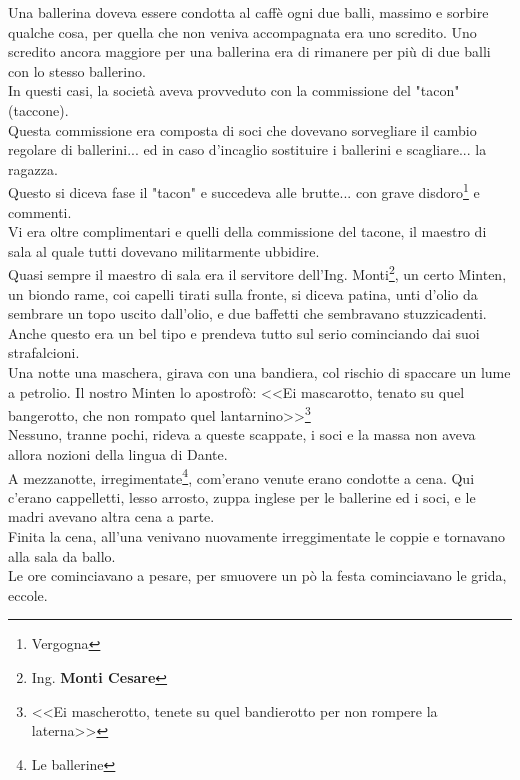 \indent Una ballerina doveva essere condotta al caffè ogni due balli, massimo e sorbire qualche cosa, per quella che non veniva accompagnata era uno scredito. Uno scredito ancora maggiore per una ballerina era di rimanere per più di due balli con lo stesso ballerino.\\
\indent In questi casi, la società aveva provveduto con la commissione del "tacon" (taccone).\\
\indent Questa commissione era composta di soci che dovevano sorvegliare il cambio regolare di ballerini... ed in caso d'incaglio sostituire i ballerini e scagliare... la ragazza.\\
\indent Questo si diceva fase il "tacon" e succedeva alle brutte... con grave disdoro\footnote{Vergogna} e commenti.\\
\indent Vi era oltre complimentari e quelli della commissione del tacone, il maestro di sala al quale tutti dovevano militarmente ubbidire. \\
\indent Quasi sempre il maestro di sala era il servitore dell'Ing. Monti\footnote{Ing. \textbf{Monti Cesare}}, un certo Minten, un biondo rame, coi capelli tirati sulla fronte, si diceva patina, unti d'olio da sembrare un topo uscito dall'olio, e due baffetti che sembravano stuzzicadenti. \\
\indent Anche questo era un bel tipo e prendeva tutto sul serio cominciando dai suoi strafalcioni.\\
\indent Una notte una maschera, girava con una bandiera, col rischio di spaccare un lume a petrolio. Il nostro Minten lo apostrofò: <<Ei mascarotto, tenato su quel bangerotto, che non rompato quel lantarnino>>\footnote{<<Ei mascherotto, tenete su quel bandierotto per non rompere la laterna>>}\\
\indent Nessuno, tranne pochi, rideva a queste scappate, i soci e la massa non aveva allora nozioni della lingua di Dante.\\
\indent A mezzanotte, irregimentate\footnote{Le ballerine}, com'erano venute erano condotte a cena. Qui c'erano cappelletti, lesso arrosto, zuppa inglese per le ballerine ed i soci, e le madri avevano altra cena a parte.\\
\indent Finita la cena, all'una venivano nuovamente irreggimentate le coppie e tornavano alla sala da ballo.\\
\indent Le ore cominciavano a pesare, per smuovere un pò la festa cominciavano le grida, eccole.\\
